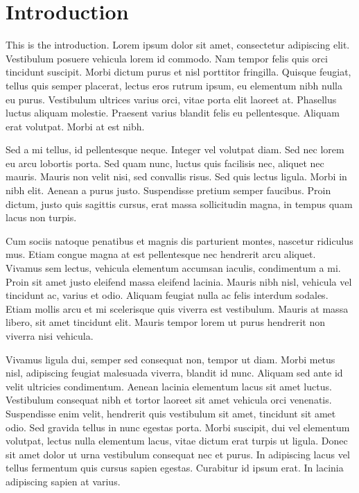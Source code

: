\chapter{Introduction}

This is the introduction. Lorem ipsum dolor sit amet, consectetur adipiscing elit. Vestibulum posuere vehicula lorem id commodo. Nam tempor felis quis orci tincidunt suscipit. Morbi dictum purus et nisl porttitor fringilla. Quisque feugiat, tellus quis semper placerat, lectus eros rutrum ipsum, eu elementum nibh nulla eu purus. Vestibulum ultrices varius orci, vitae porta elit laoreet at. Phasellus luctus aliquam molestie. Praesent varius blandit felis eu pellentesque. Aliquam erat volutpat. Morbi at est nibh.

Sed a mi tellus, id pellentesque neque. Integer vel volutpat diam. Sed nec lorem eu arcu lobortis porta. Sed quam nunc, luctus quis facilisis nec, aliquet nec mauris. Mauris non velit nisi, sed convallis risus. Sed quis lectus ligula. Morbi in nibh elit. Aenean a purus justo. Suspendisse pretium semper faucibus. Proin dictum, justo quis sagittis cursus, erat massa sollicitudin magna, in tempus quam lacus non turpis.

Cum sociis natoque penatibus et magnis dis parturient montes, nascetur ridiculus mus. Etiam congue magna at est pellentesque nec hendrerit arcu aliquet. Vivamus sem lectus, vehicula elementum accumsan iaculis, condimentum a mi. Proin sit amet justo eleifend massa eleifend lacinia. Mauris nibh nisl, vehicula vel tincidunt ac, varius et odio. Aliquam feugiat nulla ac felis interdum sodales. Etiam mollis arcu et mi scelerisque quis viverra est vestibulum. Mauris at massa libero, sit amet tincidunt elit. Mauris tempor lorem ut purus hendrerit non viverra nisi vehicula.

Vivamus ligula dui, semper sed consequat non, tempor ut diam. Morbi metus nisl, adipiscing feugiat malesuada viverra, blandit id nunc. Aliquam sed ante id velit ultricies condimentum. Aenean lacinia elementum lacus sit amet luctus. Vestibulum consequat nibh et tortor laoreet sit amet vehicula orci venenatis. Suspendisse enim velit, hendrerit quis vestibulum sit amet, tincidunt sit amet odio. Sed gravida tellus in nunc egestas porta. Morbi suscipit, dui vel elementum volutpat, lectus nulla elementum lacus, vitae dictum erat turpis ut ligula. Donec sit amet dolor ut urna vestibulum consequat nec et purus. In adipiscing lacus vel tellus fermentum quis cursus sapien egestas. Curabitur id ipsum erat. In lacinia adipiscing sapien at varius.

